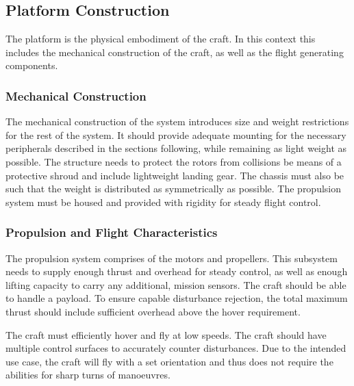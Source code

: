 		\subsection{Platform Construction}
		The platform is the physical embodiment of the craft. In this context this includes the mechanical construction of the craft, as well as the flight generating components.
		
			\subsubsection{Mechanical Construction}
			The mechanical construction of the system introduces size and weight restrictions for the rest of the system. It should provide adequate mounting for the necessary peripherals described in the sections following, while remaining as light weight as possible. The structure needs to protect the rotors from collisions be means of a protective shroud and include lightweight landing gear. The chassis must also be such that the weight is distributed as symmetrically as possible. The propulsion system must be housed and provided with rigidity for steady flight control.
			
			\subsubsection{Propulsion and Flight Characteristics}
			The propulsion system comprises of the motors and propellers. This subsystem needs to supply enough thrust and overhead for steady control, as well as enough lifting capacity to carry any additional, mission sensors. The craft should be able to handle a \payLoadMass payload. To ensure capable disturbance rejection, the total maximum thrust should include sufficient overhead above the hover requirement.
			
			The craft must efficiently hover and fly at low speeds. The craft should have multiple control surfaces to accurately counter disturbances. Due to the intended use case, the craft will fly with a set orientation and thus does not require the abilities for sharp turns of manoeuvres.	
		
